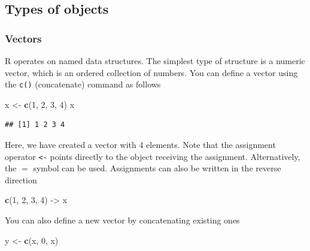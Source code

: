 \documentclass[
]{article}
\newenvironment{Shaded}{\begin{snugshade}}{\end{snugshade}}
\newcommand{\DecValTok}[1]{\textcolor[rgb]{0.00,0.00,0.81}{#1}}
\newcommand{\FunctionTok}[1]{\textcolor[rgb]{0.13,0.29,0.53}{\textbf{#1}}}
\newcommand{\NormalTok}[1]{#1}
\newcommand{\OtherTok}[1]{\textcolor[rgb]{0.56,0.35,0.01}{#1}}
\begin{document}
\hypertarget{types-of-objects}{%
\subsection{Types of objects}\label{types-of-objects}}

\hypertarget{vectors}{%
\subsubsection{Vectors}\label{vectors}}

R operates on named data structures. The simplest type of structure is a
numeric vector, which is an ordered collection of numbers. You can
define a vector using the \texttt{c()} (concatenate) command as follows

\begin{Shaded}
\begin{Highlighting}[]
\NormalTok{x }\OtherTok{\textless{}{-}} \FunctionTok{c}\NormalTok{(}\DecValTok{1}\NormalTok{, }\DecValTok{2}\NormalTok{, }\DecValTok{3}\NormalTok{, }\DecValTok{4}\NormalTok{)}
\NormalTok{x}
\end{Highlighting}
\end{Shaded}

\begin{verbatim}
## [1] 1 2 3 4
\end{verbatim}

Here, we have created a vector with 4 elements. Note that the assignment
operator \texttt{\textless{}-} points directly to the object receiving
the assignment. Alternatively, the \(=\) symbol can be used. Assignments
can also be written in the reverse direction

\begin{Shaded}
\begin{Highlighting}[]
\FunctionTok{c}\NormalTok{(}\DecValTok{1}\NormalTok{, }\DecValTok{2}\NormalTok{, }\DecValTok{3}\NormalTok{, }\DecValTok{4}\NormalTok{) }\OtherTok{{-}\textgreater{}}\NormalTok{ x}
\end{Highlighting}
\end{Shaded}

You can also define a new vector by concatenating existing ones

\begin{Shaded}
\begin{Highlighting}[]
\NormalTok{y }\OtherTok{\textless{}{-}} \FunctionTok{c}\NormalTok{(x, }\DecValTok{0}\NormalTok{, x)}
\end{Highlighting}
\end{Shaded}
\end{document}

